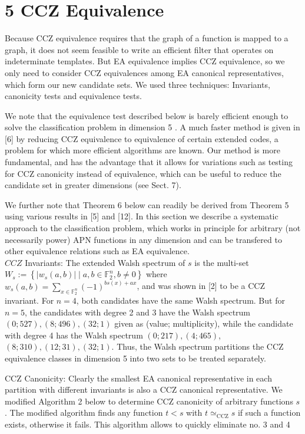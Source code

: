 \documentclass[10pt]{article}
\begin{document}
\section*{5 CCZ Equivalence}
Because CCZ equivalence requires that the graph of a function is mapped to a graph, it does not seem feasible to write an efficient filter that operates on indeterminate templates. But EA equivalence implies CCZ equivalence, so we only need to consider CCZ equivalences among EA canonical representatives, which form our new candidate sets. We used three techniques: Invariants, canonicity tests and equivalence tests.

We note that the equivalence test described below is barely efficient enough to solve the classification problem in dimension 5 . A much faster method is given in [6] by reducing CCZ equivalence to equivalence of certain extended codes, a problem for which more efficient algorithms are known. Our method is more fundamental, and has the advantage that it allows for variations such as testing for CCZ canonicity instead of equivalence, which can be useful to reduce the candidate set in greater dimensions (see Sect. 7).

We further note that Theorem 6 below can readily be derived from Theorem 5 using various results in [5] and [12]. In this section we describe a systematic approach to the classification problem, which works in principle for arbitrary (not necessarily power) APN functions in any dimension and can be transfered to other equivalence relations such as EA equivalence.\\
$C C Z$ Invariants: The extended Walsh spectrum of $s$ is the multi-set $W_{s}:= \left\{\left|w_{s}(a, b)\right| \mid a, b \in \mathbb{F}_{2}^{n}, b \neq 0\right\}$ where $w_{s}(a, b)=\sum_{x \in \mathbb{F}_{2}^{n}}(-1)^{b s(x)+a x}$, and was shown in [2] to be a CCZ invariant. For $n=4$, both candidates have the same Walsh spectrum. But for $n=5$, the candidates with degree 2 and 3 have the Walsh spectrum $(0 ; 527),(8 ; 496),(32 ; 1)$ given as (value; multiplicity), while the candidate with degree 4 has the Walsh spectrum $(0 ; 217),(4 ; 465)$, $(8 ; 310),(12 ; 31),(32 ; 1)$. Thus, the Walsh spectrum partitions the CCZ equivalence classes in dimension 5 into two sets to be treated separately.

CCZ Canonicity: Clearly the smallest EA canonical representative in each partition with different invariants is also a CCZ canonical representative. We modified Algorithm 2 below to determine CCZ canonicity of arbitrary functions $s$. The modified algorithm finds any function $t<s$ with $t \simeq_{\mathrm{CCZ}} s$ if such a function exists, otherwise it fails. This algorithm allows to quickly eliminate no. 3 and 4
\end{document}
